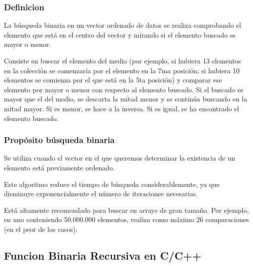 \documentclass{beamer}
\begin{document}
		\begin{frame}
			\frametitle{Definicion}
				\begin{center}
				La búsqueda binaria en un vector ordenado de datos se realiza comprobando el elemento que está en el centro del vector y mirando si el elemento buscado es mayor o menor. 
				
				Consiste en buscar el elemento del medio (por ejemplo, si hubiera 13 elementos en la colección se comenzaría por el elemento en la 7ma posición; si hubiera 10 elementos se comienza por el que está en la 5ta posición) y comparar ese elemento por mayor o menor con respecto al elemento buscado. Si el buscado es mayor que el del medio, se descarta la mitad menor y se continúa buscando en la mitad mayor. Si es menor, se hace a la inversa. Si es igual, se ha encontrado el elemento buscado. 
				\end{center}
		
		\end{frame}

		\begin{frame}
			\frametitle{Propósito búsqueda binaria}
				
			\begin{center}
			Se utiliza cuando el vector en el que queremos determinar la existencia de un elemento está previamente ordenado.

			Este algoritmo reduce el tiempo de búsqueda considerablemente, ya que disminuye exponencialmente el número de iteraciones necesarias.
			
			Está altamente recomendado para buscar en arrays de gran tamaño. Por ejemplo, en uno conteniendo 50.000.000 elementos, realiza como máximo 26 comparaciones (en el peor de los casos).

			\end{center}
		\end{frame}


	\subsection{Funcion Binaria Recursiva en C/C++}

\end{document}
